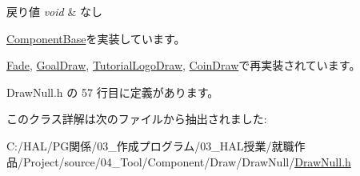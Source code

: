 \begin{DoxyRetVals}{戻り値}
{\em void} & なし \\
\hline
\end{DoxyRetVals}


\mbox{\hyperlink{class_component_base_a58e66d65bc8f3cd5ab67b4b2deab4fc2}{Component\+Base}}を実装しています。



\mbox{\hyperlink{class_fade_a1579b5b9020344a1131ea11c15f2c0bd}{Fade}}, \mbox{\hyperlink{class_goal_draw_a6e003277ed44eb9c800a616b6acbcb20}{Goal\+Draw}}, \mbox{\hyperlink{class_tutorial_logo_draw_af69405fcc8b20684a19e982726d93ffa}{Tutorial\+Logo\+Draw}}, \mbox{\hyperlink{class_coin_draw_a6157b17bf1706b85156aad0d88acfd7e}{Coin\+Draw}}で再実装されています。



 Draw\+Null.\+h の 57 行目に定義があります。



このクラス詳解は次のファイルから抽出されました\+:\begin{DoxyCompactItemize}
\item 
C\+:/\+H\+A\+L/\+P\+G関係/03\+\_\+作成プログラム/03\+\_\+\+H\+A\+L授業/就職作品/\+Project/source/04\+\_\+\+Tool/\+Component/\+Draw/\+Draw\+Null/\mbox{\hyperlink{_draw_null_8h}{Draw\+Null.\+h}}\end{DoxyCompactItemize}
